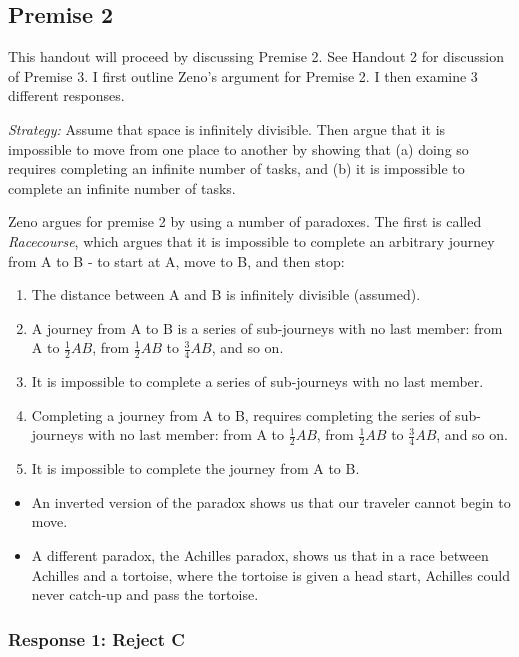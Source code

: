 \documentclass[]{article}
\begin{document}
\subsection{Premise 2}\label{premise-2}

This handout will proceed by discussing Premise 2. See Handout 2 for
discussion of Premise 3. I first outline Zeno's argument for Premise 2.
I then examine 3 different responses.

\emph{Strategy:} Assume that space is infinitely divisible. Then argue
that it is impossible to move from one place to another by showing that
(a) doing so requires completing an infinite number of tasks, and (b) it
is impossible to complete an infinite number of tasks.

Zeno argues for premise 2 by using a number of paradoxes. The first is
called \emph{Racecourse}, which argues that it is impossible to complete
an arbitrary journey from A to B - to start at A, move to B, and then
stop:

\begin{enumerate}
\def\labelenumi{\Alph{enumi}.}
\item
  The distance between A and B is infinitely divisible (assumed).
\item
  A journey from A to B is a series of sub-journeys with no last member:
  from A to \(\frac{1}{2}AB\), from \(\frac{1}{2}AB\) to
  \(\frac{3}{4}AB\), and so on.
\item
  It is impossible to complete a series of sub-journeys with no last
  member.
\item
  Completing a journey from A to B, requires completing the series of
  sub-journeys with no last member: from A to \(\frac{1}{2}AB\), from
  \(\frac{1}{2}AB\) to \(\frac{3}{4}AB\), and so on.
\item
  It is impossible to complete the journey from A to B.
\end{enumerate}

\begin{itemize}
\itemsep1pt\parskip0pt
\item
  An inverted version of the paradox shows us that our traveler cannot
  begin to move.
\item
  A different paradox, the Achilles paradox, shows us that in a race
  between Achilles and a tortoise, where the tortoise is given a head
  start, Achilles could never catch-up and pass the tortoise.
\end{itemize}

\subsubsection{Response 1: Reject C}\label{response-1-reject-c}
\end{document}
